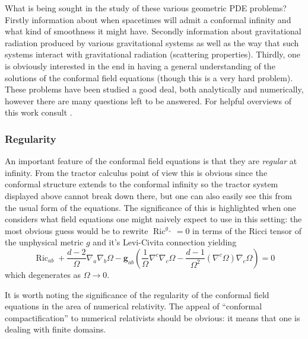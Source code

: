\documentclass[a4paper,12pt]{amsart}
\def\Rico{\operatorname{Ric}^{g_+}}
\theoremstyle{remark}
\newcommand{\Ric}{\operatorname{Ric}}
\begin{document}
What is being sought in the study of these various geometric PDE problems?
Firstly information about when spacetimes will admit a conformal infinity
and what kind of smoothness it might have. Secondly information about
gravitational radiation produced by various gravitational systems
as well as the way that such systems interact with gravitational radiation
(scattering properties). Thirdly, one is obviously interested in the
end in having a general understanding of the solutions of the conformal
field equations (though this is a very hard problem). These problems
have been studied a good deal, both analytically and
numerically, however there are many questions left to be answered.
For helpful overviews of this work consult \cite{Joerg-ConfInf,Friedrich-ConfEinsteinEv}.

\subsubsection{Regularity}
An important feature of the conformal field equations is that they
are \emph{regular} at infinity. From the tractor calculus point of
view this is obvious since the conformal structure extends to the
conformal infinity so the tractor system displayed above cannot break
down there, but one can also easily see this from the usual form of
the equations. The significance of this is highlighted when one considers
what field equations one might naively expect to use in this setting:
the most obvious guess would be to rewrite $\Rico=0$ in terms of the
Ricci tensor of the unphysical metric $g$ and it's Levi-Civita connection
yielding 
\[
\Ric_{ab}+\frac{d-2}{\Omega}\nabla_{a}\nabla_{b}\Omega-\boldsymbol{g}_{ab}\left(\frac{1}{\Omega}\nabla^{c}\nabla_{c}\Omega-\frac{d-1}{\Omega^{2}}(\nabla^{c}\Omega)\nabla_{c}\Omega\right)=0
\]
which degenerates as $\Omega\rightarrow0$.

It is worth noting the significance of the regularity of the conformal
field equations in the area of numerical relativity. The appeal of
``conformal compactification'' to numerical relativists should be
obvious: it means that one is dealing with finite domains. %
\end{document}
